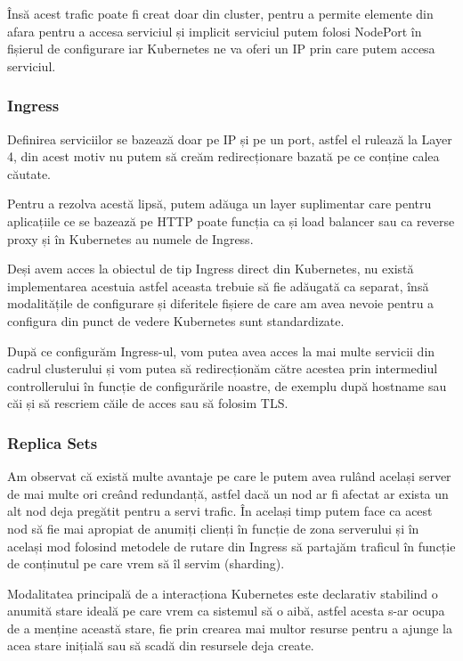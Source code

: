 Însă acest trafic poate fi creat doar din cluster, pentru a permite elemente din afara 
pentru a accesa serviciul și implicit serviciul putem folosi NodePort în fișierul de 
configurare iar Kubernetes ne va oferi un IP prin care putem accesa serviciul.

\subsubsection{Ingress}

Definirea serviciilor se bazează doar pe IP și pe un port, astfel el rulează la 
Layer 4, din acest motiv nu putem să creăm redirecționare bazată pe ce conține 
calea căutate.

Pentru a rezolva acestă lipsă, putem adăuga un layer suplimentar care pentru 
aplicațiile ce se bazează pe HTTP poate funcția ca și load balancer sau ca reverse proxy
și în Kubernetes au numele de Ingress.

Deși avem acces la obiectul de tip Ingress direct din Kubernetes, 
nu există implementarea acestuia astfel aceasta trebuie să fie adăugată ca separat,
însă modalitățile de configurare și diferitele fișiere de care am avea nevoie pentru
a configura din punct de vedere Kubernetes sunt standardizate.

După ce configurăm Ingress-ul, vom putea avea acces la mai multe servicii din cadrul
clusterului și vom putea să redirecționăm către acestea prin intermediul controllerului
în funcție de configurările noastre, de exemplu după hostname sau căi și să rescriem
căile de acces sau să folosim TLS.

\subsubsection{Replica Sets}

Am observat că există multe avantaje pe care le putem avea rulând același server
de mai multe ori creând redundanță, astfel dacă un nod ar fi afectat ar exista un alt nod
deja pregătit pentru a servi trafic. În același timp putem face ca acest nod 
să fie mai apropiat de anumiți clienți în funcție de zona serverului și în același mod
folosind metodele de rutare din Ingress să partajăm traficul în funcție de conținutul
pe care vrem să îl servim (sharding).

Modalitatea principală de a interacționa Kubernetes este declarativ stabilind 
o anumită stare ideală pe care vrem ca sistemul să o aibă, astfel acesta s-ar ocupa
de a menține această stare, fie prin crearea mai multor resurse pentru a ajunge la 
acea stare inițială sau să scadă din resursele deja create.

